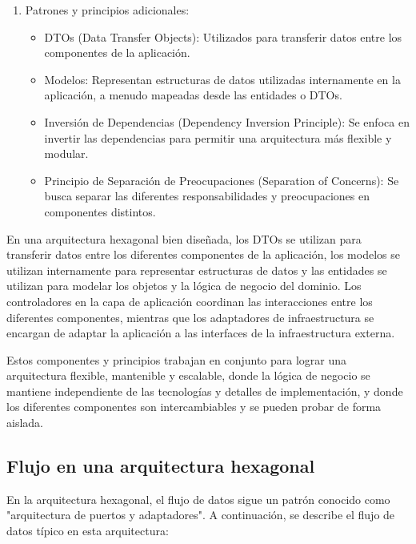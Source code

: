 \documentclass[executivepaper]{article}
\begin{document}
\begin{enumerate}
\begin{itemize}
    \end{itemize}
    \item Patrones y principios adicionales:
    \begin{itemize}
        \item DTOs (Data Transfer Objects): Utilizados para transferir datos entre los componentes de la aplicación.
        \item Modelos: Representan estructuras de datos utilizadas internamente en la aplicación, a menudo mapeadas desde las entidades o DTOs.
        \item Inversión de Dependencias (Dependency Inversion Principle): Se enfoca en invertir las dependencias para permitir una arquitectura más flexible y modular.
        \item Principio de Separación de Preocupaciones (Separation of Concerns): Se busca separar las diferentes responsabilidades y preocupaciones en componentes distintos.
    \end{itemize}
\end{enumerate}

En una arquitectura hexagonal bien diseñada, los DTOs se utilizan para transferir datos entre los diferentes componentes de la aplicación, los modelos se utilizan internamente para representar estructuras de datos y las entidades se utilizan para modelar los objetos y la lógica de negocio del dominio. Los controladores en la capa de aplicación coordinan las interacciones entre los diferentes componentes, mientras que los adaptadores de infraestructura se encargan de adaptar la aplicación a las interfaces de la infraestructura externa.

Estos componentes y principios trabajan en conjunto para lograr una arquitectura flexible, mantenible y escalable, donde la lógica de negocio se mantiene independiente de las tecnologías y detalles de implementación, y donde los diferentes componentes son intercambiables y se pueden probar de forma aislada.

\subsection{Flujo en una arquitectura hexagonal}

En la arquitectura hexagonal, el flujo de datos sigue un patrón conocido como "arquitectura de puertos y adaptadores". A continuación, se describe el flujo de datos típico en esta arquitectura:
\end{document}
